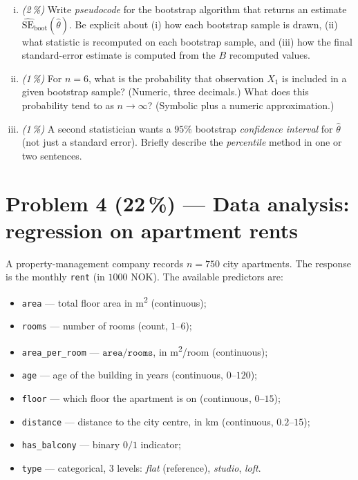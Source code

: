 \documentclass[11pt,a4paper]{article}
\newcommand{\points}[1]{\textbf{(#1\,\%)}}
\newcommand{\subpoints}[1]{\textit{(#1\,\%)}}
\begin{document}
\begin{enumerate}[(i)]
  \item \subpoints{2} Write \emph{pseudocode} for the bootstrap algorithm that returns an estimate $\widehat{\mathrm{SE}}_{\mathrm{boot}}(\hat\theta)$. Be explicit about (i) how each bootstrap sample is drawn, (ii) what statistic is recomputed on each bootstrap sample, and (iii) how the final standard-error estimate is computed from the $B$ recomputed values.

  \item \subpoints{1} For $n = 6$, what is the probability that observation $X_1$ is included in a given bootstrap sample? (Numeric, three decimals.) What does this probability tend to as $n \to \infty$? (Symbolic plus a numeric approximation.)

  \item \subpoints{1} A second statistician wants a $95\%$ bootstrap \emph{confidence interval} for $\hat\theta$ (not just a standard error). Briefly describe the \emph{percentile} method in one or two sentences.
\end{enumerate}

\vfill\eject

\section*{Problem 4 \points{22} --- Data analysis: regression on apartment rents}

A property-management company records $n = 750$ city apartments. The response is the monthly \texttt{rent} (in $1000$ NOK). The available predictors are:
\begin{itemize}
  \item \texttt{area} --- total floor area in m\textsuperscript{2} (continuous);
  \item \texttt{rooms} --- number of rooms (count, $1$--$6$);
  \item \texttt{area\_per\_room} --- $\texttt{area}/\texttt{rooms}$, in m\textsuperscript{2}/room (continuous);
  \item \texttt{age} --- age of the building in years (continuous, $0$--$120$);
  \item \texttt{floor} --- which floor the apartment is on (continuous, $0$--$15$);
  \item \texttt{distance} --- distance to the city centre, in km (continuous, $0.2$--$15$);
  \item \texttt{has\_balcony} --- binary $0/1$ indicator;
  \item \texttt{type} --- categorical, $3$ levels: \emph{flat} (reference), \emph{studio}, \emph{loft}.
\end{itemize}
\end{document}
